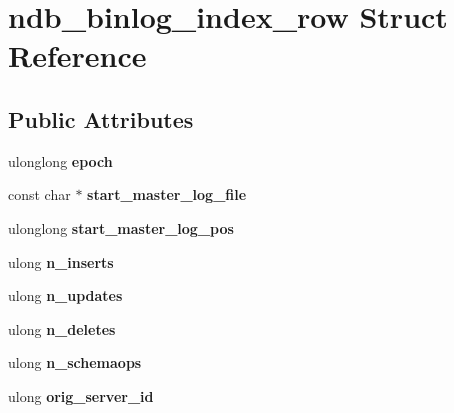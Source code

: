 \hypertarget{structndb__binlog__index__row}{}\section{ndb\+\_\+binlog\+\_\+index\+\_\+row Struct Reference}
\label{structndb__binlog__index__row}
\subsection*{Public Attributes}
\begin{DoxyCompactItemize}
\item 
\mbox{\label{structndb__binlog__index__row_a18edd73d9f1bd1bdcf5ccb62cfca1b6b}} 
ulonglong {\bfseries epoch}
\item 
\mbox{\label{structndb__binlog__index__row_ad8a0c7f028bce739180b42101ce05723}} 
const char $\ast$ {\bfseries start\+\_\+master\+\_\+log\+\_\+file}
\item 
\mbox{\label{structndb__binlog__index__row_af0fc71af6ed8978a61e2b451d7c31804}} 
ulonglong {\bfseries start\+\_\+master\+\_\+log\+\_\+pos}
\item 
\mbox{\label{structndb__binlog__index__row_a2e89439a4334847396047f5cde0e9c7c}} 
ulong {\bfseries n\+\_\+inserts}
\item 
\mbox{\label{structndb__binlog__index__row_afb1bfd58addea604dba62dc14a64c442}} 
ulong {\bfseries n\+\_\+updates}
\item 
\mbox{\label{structndb__binlog__index__row_a9c99160d86ed24cfe098df49a4258957}} 
ulong {\bfseries n\+\_\+deletes}
\item 
\mbox{\label{structndb__binlog__index__row_a9c6b8770c8ee43f7b8836b095b3da50e}} 
ulong {\bfseries n\+\_\+schemaops}
\item 
\mbox{\label{structndb__binlog__index__row_a0b3d9a07580c3a58b667a837920a2c0c}} 
ulong {\bfseries orig\+\_\+server\+\_\+id}

\end{DoxyCompactItemize}

